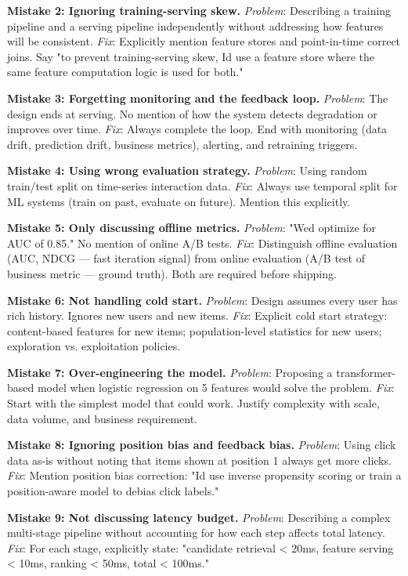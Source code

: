 \documentclass[11pt]{article}
\begin{document}
\textbf{Mistake 2: Ignoring training-serving skew.}
\emph{Problem}: Describing a training pipeline and a serving pipeline independently without addressing how features will be consistent.
\emph{Fix}: Explicitly mention feature stores and point-in-time correct joins. Say "to prevent training-serving skew, I\textquotesingle d use a feature store where the same feature computation logic is used for both."

\textbf{Mistake 3: Forgetting monitoring and the feedback loop.}
\emph{Problem}: The design ends at serving. No mention of how the system detects degradation or improves over time.
\emph{Fix}: Always complete the loop. End with monitoring (data drift, prediction drift, business metrics), alerting, and retraining triggers.

\textbf{Mistake 4: Using wrong evaluation strategy.}
\emph{Problem}: Using random train/test split on time-series interaction data.
\emph{Fix}: Always use temporal split for ML systems (train on past, evaluate on future). Mention this explicitly.

\textbf{Mistake 5: Only discussing offline metrics.}
\emph{Problem}: "We\textquotesingle d optimize for AUC of 0.85." No mention of online A/B tests.
\emph{Fix}: Distinguish offline evaluation (AUC, NDCG --- fast iteration signal) from online evaluation (A/B test of business metric --- ground truth). Both are required before shipping.

\textbf{Mistake 6: Not handling cold start.}
\emph{Problem}: Design assumes every user has rich history. Ignores new users and new items.
\emph{Fix}: Explicit cold start strategy: content-based features for new items; population-level statistics for new users; exploration vs. exploitation policies.

\textbf{Mistake 7: Over-engineering the model.}
\emph{Problem}: Proposing a transformer-based model when logistic regression on 5 features would solve the problem.
\emph{Fix}: Start with the simplest model that could work. Justify complexity with scale, data volume, and business requirement.

\textbf{Mistake 8: Ignoring position bias and feedback bias.}
\emph{Problem}: Using click data as-is without noting that items shown at position 1 always get more clicks.
\emph{Fix}: Mention position bias correction: "I\textquotesingle d use inverse propensity scoring or train a position-aware model to debias click labels."

\textbf{Mistake 9: Not discussing latency budget.}
\emph{Problem}: Describing a complex multi-stage pipeline without accounting for how each step affects total latency.
\emph{Fix}: For each stage, explicitly state: "candidate retrieval \textless{} 20ms, feature serving \textless{} 10ms, ranking \textless{} 50ms, total \textless{} 100ms."
\end{document}
